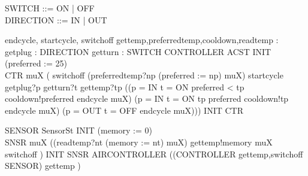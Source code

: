 \begin{zed}
SWITCH ::= ON | OFF\\
\also DIRECTION ::= IN | OUT\\
\end{zed}

\begin{circus}
\circchannel endcycle, startcycle, switchoff
\also \circchannel gettemp,preferredtemp,cooldown,readtemp : \nat
\also \circchannel getplug : DIRECTION
\also \circchannel getturn : SWITCH
\also \circprocess CONTROLLER \circdef \circbegin
\circstate ACST 
INIT \circdef (preferred := 25)\\
CTR \circdef \circmu muX \circspot 
	( switchoff \then \Skip
					\extchoice (preferredtemp?np \then (preferred := np) \circseq muX)
					\extchoice startcycle \then getplug?p \then getturn?t \then
					gettemp?tp \then
					((\lcircguard p = IN \land t = ON \land preferred < tp \rcircguard
                  \circguard cooldown!preferred \then endcycle \then muX)
                  \extchoice (\lcircguard p = IN \land t = ON \land tp \leq preferred \rcircguard
                  \circguard cooldown!tp \then endcycle \then muX)
                  \extchoice (\lcircguard p = OUT \land t = OFF \rcircguard
                  \circguard endcycle \then muX)))
\circspot INIT \circseq CTR
\circend

\also \circprocess SENSOR \circdef \circbegin
\circstate SensorSt 
INIT \circdef (memory := 0)\\
SNSR \circdef \circmu muX \circspot 
	((readtemp?nt \then (memory := nt) \circseq muX)
	\extchoice gettemp!memory \then muX
	\extchoice switchoff \then \Skip)
\circspot INIT \circseq SNSR
\circend
\also \circprocess AIRCONTROLLER \circdef
((CONTROLLER \lpar \lchanset gettemp,switchoff \rchanset \rpar SENSOR) \circhide \lchanset gettemp \rchanset)
\end{circus}